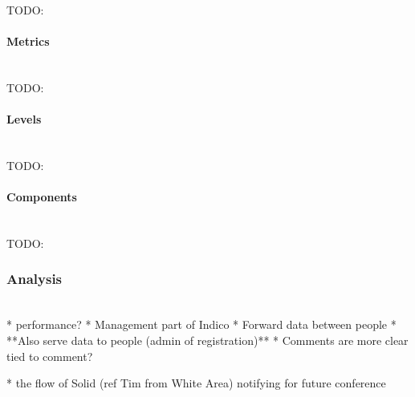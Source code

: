 TODO:
\vspace{0.5cm}
\paragraph{Metrics}\mbox{}\\

TODO:
\vspace{0.5cm}
\paragraph{Levels}\mbox{}\\

TODO:
\vspace{0.5cm}
\paragraph{Components}\mbox{}\\

TODO:
\vspace{0.5cm}
\subsubsection{Analysis}\mbox{}\\

* performance?
* Management part of Indico
  * Forward data between people
  * **Also serve data to people (admin of registration)**
* Comments are more clear tied to comment?

* the flow of Solid (ref Tim from White Area) notifying for future conference